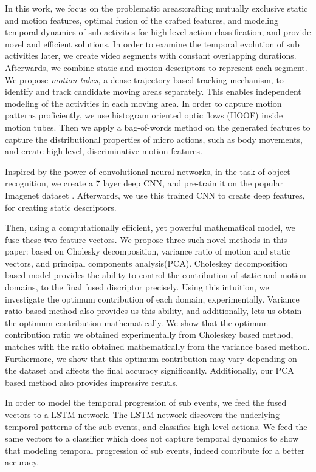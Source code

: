 In this work, we focus on the problematic areas:crafting mutually exclusive static and motion features, optimal fusion of the crafted features, and 
modeling temporal dynamics of sub activites for high-level action classification, and provide 
novel and efficient solutions. In order to examine the temporal evolution 
of sub activities later, we create video segments with constant overlapping durations. Afterwards, we combine static and motion
descriptors to represent each segment. We propose \textit{motion tubes},
a dense trajectory \cite{wang2011action} based tracking mechanism, to identify and track candidate moving areas
separately. This enables independent modeling of the activities in each moving area.
In order to capture motion patterns proficiently, we use histogram oriented optic flows (HOOF) \cite{chaudhry2009histograms}
inside motion tubes. Then we apply a bag-of-words method on the generated 
features to capture the distributional properties of micro actions, such as body movements, and create high level, discriminative motion features. 

Inspired by the power of convolutional neural networks, in the task of object recognition, we create a 7 layer deep
CNN, and pre-train it on the popular Imagenet dataset \cite{deng2012imagenet}.
Afterwards, we use this trained CNN to create deep features, for creating static descriptors. 

Then, using a computationally efficient, yet powerful mathematical model, we fuse these 
two feature vectors. We propose three such novel methods in this paper: based on
Cholesky decomposition, variance ratio of motion and static vectors, and principal components analysis(PCA). Choleskey decomposition based model provides the ability to 
control the contribution of static and motion domains,
to the final fused discriptor precisely. Using this intuition, we investigate the 
optimum contribution of each domain, experimentally.  Variance ratio based method also provides us this ability, and additionally, lets us
obtain the optimum contribution mathematically. We show that the optimum contribution ratio we obtained experimentally from Choleskey based method, 
matches with the ratio obtained mathematically from the variance based method. Furthermore, we show that this optimum contribution may
vary depending on the dataset and affects the final accuracy significantly. Additionally, our PCA based method also provides 
impressive resutls. 


In order to model the temporal progression of sub events, we feed the fused vectors to 
a LSTM network. The LSTM network discovers the underlying temporal patterns of the sub events, and classifies high level actions. 
We feed the same vectors to a classifier which does not capture temporal dynamics
to show that modeling temporal progression of sub events, indeed contribute for a better 
accuracy. 

